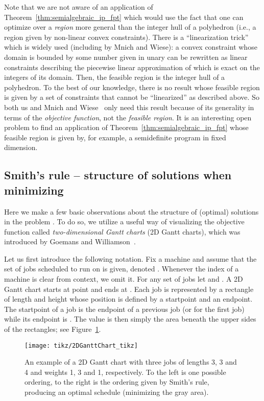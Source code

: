 \documentclass{llncs}
\begin{document}
Note that we are not aware of an application of Theorem~\ref{thm:semialgebraic_ip_fpt} which would use the fact that one can optimize over a \textit{region} more general than the integer hull of a polyhedron (i.e., a region given by non-linear convex constraints). There is a ``linearization trick'' which is widely used (including by Mnich and Wiese): a convex constraint  whose domain is bounded by some number  given in unary can be rewritten as  linear constraints describing the piecewise linear approximation of  which is exact on the  integers of its domain. Then, the feasible region is the integer hull of a polyhedron. To the best of our knowledge, there is no result whose feasible region is given by a set of constraints that cannot be ``linearized'' as described above. So both us and Mnich and Wiese~\cite{MnichW:14} only need this result because of its generality in terms of the \textit{objective function}, not the \textit{feasible region}. It is an interesting open problem to find an application of Theorem~\ref{thm:semialgebraic_ip_fpt} whose feasible region is given by, for example, a semidefinite program in fixed dimension.

\subsection{Smith's rule -- structure of solutions when minimizing }

Here we make a few basic observations about the structure of (optimal) solutions in the problem . To do so, we utilize a useful way of visualizing the objective function  called \textit{two-dimensional Gantt charts} (2D Gantt charts), which was introduced by Goemans and Williamson~\cite{GoemansW:00}.

Let us first introduce the following notation. Fix a machine  and assume that the set of jobs scheduled to run on  is given, denoted . Whenever the index of a machine  is clear from context, we omit it. For any set of jobs  let  and . A 2D Gantt chart starts at point  and ends at . Each job  is represented by a rectangle of length  and height  whose position is defined by a startpoint and an endpoint. The startpoint  of a job is the endpoint of a previous job (or  for the first job) while its endpoint is . The value  is then simply the area beneath the upper sides of the rectangles; see Figure~\ref{fig:2dgantt}.

\begin{figure}[!bt]
\texttt{[image: tikz/2DGanttChart\_tikz]}
  \caption{An example of a 2D Gantt chart with three jobs of lengths 3, 3 and 4 and weights 1, 3 and 1, respectively. To the left is one possible ordering, to the right is the ordering given by Smith's rule, producing an optimal schedule (minimizing the gray area).}\label{fig:2dgantt}
\end{figure}
\end{document}

